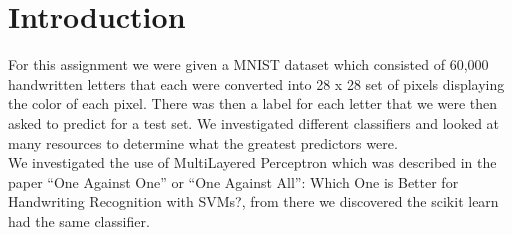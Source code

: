 
\section{Introduction}
\label{sec:intro}

For this assignment we were given a MNIST dataset which consisted of 60,000
handwritten letters that each were converted into 28 x 28 set of
pixels displaying the color of each pixel. There was then a label for
each letter that we were then asked to predict for a test set. We
investigated different classifiers and looked at many resources to
determine what the greatest predictors were.\\ 

We investigated the use of MultiLayered Perceptron which was described
in the paper “One Against One” or “One Against All”: Which One is
Better for Handwriting Recognition with SVMs?, from there
we discovered the scikit learn had the same classifier\cite{milgram}. 





